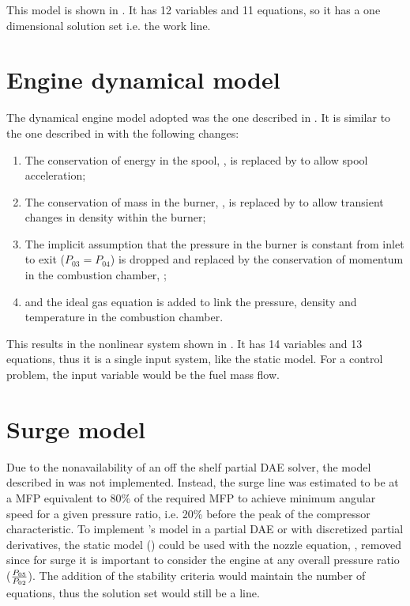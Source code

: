 This model is shown in . It has 12 variables and 11 equations, so it has a one dimensional solution set i.e. the work line.


\section{Engine dynamical model}
The dynamical engine model adopted was the one described in . It is similar to the one described in  with the following changes:

\begin{enumerate}
    \item The conservation of energy in the spool, , is replaced by  to allow spool acceleration;
    \item The conservation of mass in the burner, , is replaced by   to allow transient changes in density within the burner;
    \item The implicit assumption that the pressure in the burner is constant from inlet to exit ($P_{03}=P_{04}$) is dropped and replaced by the conservation of momentum in the combustion chamber, ;
    \item and the ideal gas equation is added to link the pressure, density and temperature in the combustion chamber.
\end{enumerate}

This results in the nonlinear system shown in . It has 14 variables and 13 equations, thus it is a single input system, like the static model. For a control problem, the input variable would be the fuel mass flow.



\section{Surge model}

Due to the nonavailability of an off the shelf partial \ac{DAE} solver, the model described in  was not implemented. Instead, the surge line was estimated to be at a \acs{MFP} equivalent to 80\% of the required \acs{MFP} to achieve minimum angular speed for a given pressure ratio, i.e. 20\% before the peak of the compressor characteristic. 
To implement 's model in a partial \ac{DAE} or with discretized partial derivatives, the static model () could be used with the nozzle equation, , removed since for surge it is important to consider the engine at any overall pressure ratio ($\frac{P_{05}}{P_{02}}$). The addition of the stability criteria would maintain the number of equations, thus the solution set would still be a line.

